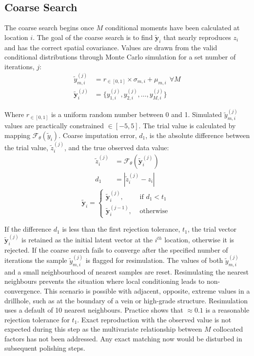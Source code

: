 \subsection{Coarse Search}
\label{subsec:coarse}

The coarse search begins once $M$ conditional moments have been calculated at location $i$. The goal of the coarse search is to find $\tilde{\mathbf{y}}_{i}$ that nearly reproduces $z_{i}$ and has the correct spatial covariance. Values are drawn from the valid conditional distributions through Monte Carlo simulation for a set number of iterations, $j$:
\begin{align}
    \tilde{y}_{m, i}^{(j)}       & = r_{\in[0,1]} \times \sigma_{m,i} + \mu_{m,i} \ \ \forall M \\
    \tilde{\mathbf{y}}_{i}^{(j)} & = \{ y_{1, i}^{(j)}, y_{2, i}^{(j)}, \dots, y_{M, i}^{(j)}\}
\end{align}

Where $r_{\in[0,1]}$ is a uniform random number between 0 and 1. Simulated $\tilde{y}_{m, i}^{(j)}$ values are practically constrained $\in[-5, 5]$. The trial value is calculated by mapping $\mathcal{F}_{\theta}(\tilde{y}_{i})$. Coarse imputation error, $d_{1}$, is the absolute difference between the trial value, $\tilde{z}_{i}^{(j)}$, and the true observed data value:
\begin{align}
    \tilde{z}_{i}^{(j)} & = \mathcal{F}_{\theta}(\tilde{\mathbf{y}}_{i}^{(j)}) \\
    d_{1}               & = |\tilde{z}_{i}^{(j)} - z_{i}|
\end{align}
\begin{equation}
    \tilde{\mathbf{y}}_{i} =
    \begin{cases}
        \tilde{\mathbf{y}}_{i}^{(j)},   & \text{ if }d_{1} < t_{1} \\
        \tilde{\mathbf{y}}_{i}^{(j-1)}, & \text{ otherwise }
    \end{cases}
\end{equation}

If the difference $d_{1}$ is less than the first rejection tolerance, $t_{1}$, the trial vector $\tilde{\mathbf{y}}_{i}^{(j)}$ is retained as the initial latent vector at the $i^{th}$ location, otherwise it is rejected. If the coarse search fails to converge after the specified number of iterations the sample $\tilde{y}_{m, i}^{(j)}$ is flagged for resimulation. The values of both $\tilde{y}_{m, i}^{(j)}$ and a small neighbourhood of nearest samples are reset. Resimulating the nearest neighbours prevents the situation where local conditioning leads to non-convergence. This scenario is possible with adjacent, opposite, extreme values in a drillhole, such as at the boundary of a vein or high-grade structure. Resimulation uses a default of 10 nearest neighbours. Practice shows that $\approx 0.1$ is a reasonable rejection tolerance for $t_{1}$. Exact reproduction with the observed value is not expected during this step as the multivariate relationship between $M$ collocated factors has not been addressed. Any exact matching now would be disturbed in subsequent polishing steps.


